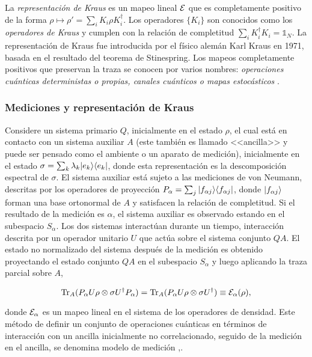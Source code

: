  La \textit{representación de Kraus} es un mapeo lineal $\mathcal{E}$ que es completamente positivo de la forma $\rho \mapsto \rho'=\sum_i K_i\rho K_i^\dagger$. Los operadores $\{K_i\}$ son conocidos como los \textit{operadores de Kraus} y cumplen con la relación de completitud $\sum_i K_i^\dagger K_i=\mathds{1}_N$. La representación de Kraus fue introducida por el físico alemán Karl Kraus en 1971, basada en el resultado del teorema de Stinespring. Los mapeos completamente positivos que preservan la traza se conocen por varios nombres: \textit{operaciones cuánticas deterministas o propias, canales cuánticos o mapas estocásticos} {\cite{2007geometry}}.


\subsubsection{Mediciones y representación de Kraus}\label{Medicion_RepresentacionDeKraus}

Considere un sistema primario $Q$, inicialmente en el estado $\rho$,  el cual está en contacto con un sistema auxiliar $A$ (este también es llamado <<ancilla>> y puede ser pensado como el ambiente o un aparato de medición), inicialmente en el estado $\sigma=\sum_k \lambda_k |e_k\rangle \langle e_k|$, donde esta representación es la descomposición espectral de $\sigma$. El sistema auxiliar está sujeto a las mediciones de von Neumann, descritas por los operadores de proyección $P_\alpha=\sum_j |f_{\alpha j}\rangle \langle f_{\alpha j}|$,  donde $|f_{\alpha j}\rangle$ forman una base ortonormal de $A$ y satisfacen la relación de completitud. Si el resultado de la medición es $\alpha$, el sistema auxiliar es observado estando en el subespacio $S_\alpha$. Los dos sistemas interactúan durante un tiempo, interacción descrita por un operador unitario $U$ que actúa sobre el sistema conjunto $QA$. El estado no normalizado del sistema después de la medición es obtenido proyectando el estado conjunto $QA$ en el subespacio $S_\alpha$ y luego aplicando la traza parcial sobre $A$,

\begin{equation}\label{measurement_model}
    {\rm Tr}_A(P_\alpha U \rho \otimes \sigma U^\dagger P_\alpha)= {\rm Tr}_A(P_\alpha U \rho \otimes \sigma U^\dagger)\equiv \mathcal{E}_\alpha(\rho),
\end{equation}


donde $\mathcal{E}_\alpha$ es un mapeo lineal en el sistema de los operadores de densidad. Este método de definir un conjunto de operaciones cuánticas en términos de interacción con un ancilla inicialmente no correlacionado, seguido de la medición en el ancilla, se denomina modelo de medición {\cite{unm2014},\cite{nielsen_chuang_2010}}.

